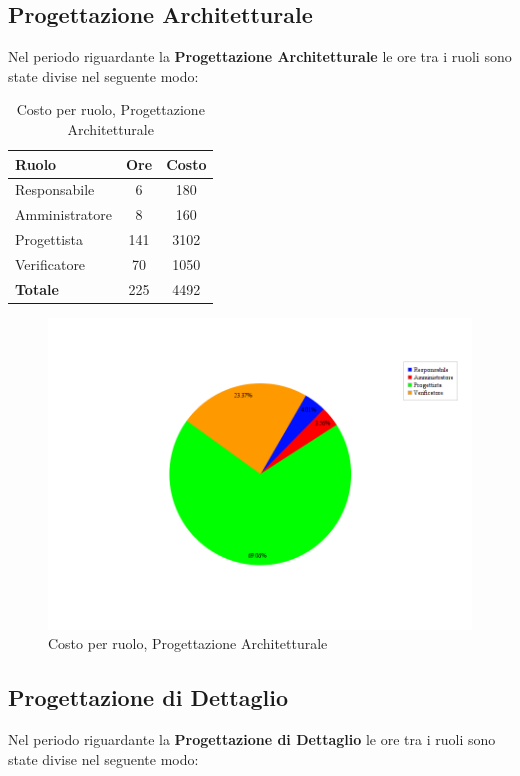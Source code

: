 \subsection{Progettazione Architetturale}
Nel periodo riguardante la \textbf{Progettazione Architetturale} le ore tra i ruoli sono state divise nel seguente modo:

\begin{table}[H]
	\begin{center}
		\begin{tabular}{|l|c|c|}
			\hline
			\textbf{Ruolo}	& \textbf{Ore} &	\textbf{Costo}	 \\
			\hline
			Responsabile	&	6	&	180		\\
			\hline
			Amministratore	&	8	&	160		\\
			\hline
			Progettista		&	141	&	3102	\\
			\hline
			Verificatore	&	70	&	1050	\\
			\hline
			\textbf{Totale}	&	225	&	4492	\\
			\hline
		\end{tabular}
	\end{center}
	\caption{Costo per ruolo, Progettazione Architetturale}
\end{table}

\begin{figure}[H]
	\centering
	\includegraphics[scale=0.4]{immagini/Grafi/CostoPA}
	\caption{Costo per ruolo, Progettazione Architetturale}
\end{figure}

\subsection{Progettazione di Dettaglio}
Nel periodo riguardante la \textbf{Progettazione di Dettaglio} le ore tra i ruoli sono state divise nel seguente modo:

